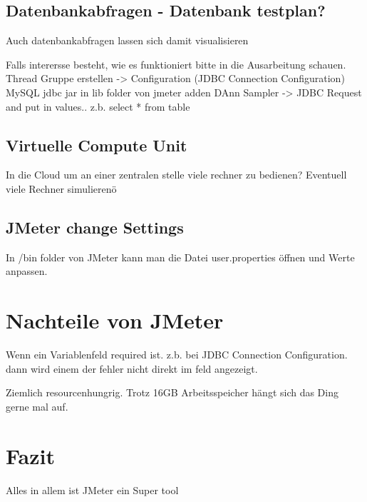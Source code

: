 \documentclass[a4paper,12pt]{article}
\begin{document}
\subsection{Datenbankabfragen - Datenbank testplan?}
Auch datenbankabfragen lassen sich damit visualisieren

Falls interersse besteht, wie es funktioniert bitte in die Ausarbeitung schauen.
Thread Gruppe erstellen -> Configuration (JDBC Connection Configuration)
MySQL jdbc jar in lib folder von jmeter adden 
DAnn Sampler -> JDBC Request and put in values.. z.b. select * from table


\subsection{Virtuelle Compute Unit}
In die Cloud um an einer zentralen stelle viele rechner zu bedienen?
Eventuell viele Rechner simulierenö

\subsection{JMeter change Settings}
In /bin folder von JMeter kann man die Datei user.properties öffnen und Werte anpassen.

\section{Nachteile von JMeter}
Wenn ein Variablenfeld required ist. z.b. bei JDBC Connection Configuration. dann wird einem der fehler nicht direkt im feld angezeigt.

Ziemlich resourcenhungrig. Trotz 16GB Arbeitsspeicher hängt sich das Ding gerne mal auf.
\section{Fazit}
Alles in allem ist JMeter ein Super tool

\pagebreak
\thispagestyle{empty}


\end{document}
